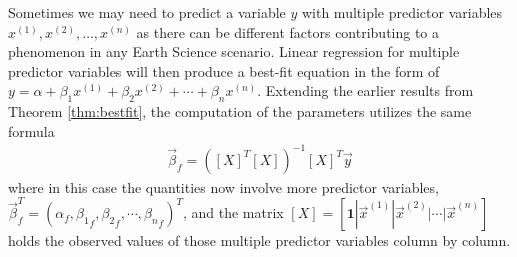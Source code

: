 Sometimes we may need to predict a variable $y$ with multiple predictor variables $x^{(1)}, x^{(2)}, \ldots, x^{(n)}$ as there can be different factors contributing to a phenomenon in any Earth Science scenario. Linear regression for multiple predictor variables will then produce a best-fit equation in the form of $y = \alpha + \beta_1x^{(1)} + \beta_2x^{(2)} + \cdots + \beta_nx^{(n)}$. Extending the earlier results from Theorem \ref{thm:bestfit}, the computation of the parameters utilizes the same formula
\begin{align*}
\vec{\beta}_f = ([X]^T[X])^{-1}[X]^T \vec{y}
\end{align*}
where in this case the quantities now involve more predictor variables, $\vec{\beta}_f^T = (\alpha_f, {\beta_1}_f, {\beta_2}_f, \cdots, {\beta_n}_f)^T$, and the matrix $[X] = [\textbf{1}|\vec{x}^{(1)}|\vec{x}^{(2)}|\cdots|\vec{x}^{(n)}]$ holds the observed values of those multiple predictor variables column by column.

